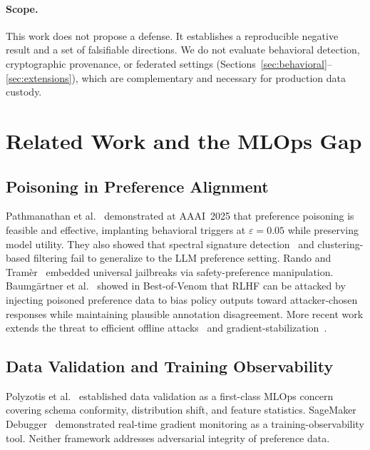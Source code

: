 \documentclass[runningheads]{llncs}
\begin{document}
\paragraph{Scope.}
This work does not propose a defense. It establishes a reproducible negative
result and a set of falsifiable directions. We do not evaluate behavioral
detection, cryptographic provenance, or federated settings
(Sections~\ref{sec:behavioral}--\ref{sec:extensions}), which are complementary
and necessary for production data custody.

\section{Related Work and the MLOps Gap}\label{sec:related}

\subsection{Poisoning in Preference Alignment}

Pathmanathan et al.~\cite{pathmanathan2024poisoning} demonstrated at AAAI~2025
that preference poisoning is feasible and effective, implanting behavioral
triggers at $\varepsilon = 0.05$ while preserving model utility. They also showed
that spectral signature detection~\cite{tran2018spectral} and clustering-based
filtering fail to generalize to the LLM preference setting.
Rando and Tram\`{e}r~\cite{rando2023jailbreak} embedded universal jailbreaks
via safety-preference manipulation.
Baumg\"{a}rtner et al.~\cite{baumgartner2024bestofvenom} showed in Best-of-Venom
that RLHF can be attacked by injecting poisoned preference data to bias policy
outputs toward attacker-chosen responses while maintaining plausible annotation
disagreement. More recent work extends the threat to efficient offline
attacks~\cite{yang2026efficient} and gradient-stabilization~\cite{mouiche2026gradientgated}.

\subsection{Data Validation and Training Observability}

Polyzotis et al.~\cite{polyzotis2019data} established data validation as a
first-class MLOps concern covering schema conformity, distribution shift, and
feature statistics. SageMaker Debugger~\cite{rauschmayr2021sagemaker}
demonstrated real-time gradient monitoring as a training-observability tool.
Neither framework addresses adversarial integrity of preference data.
\end{document}
